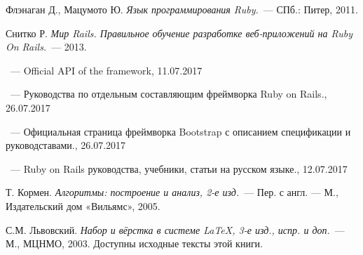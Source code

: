 \begin{thebibliography}{}

Флэнаган Д., Мацумото Ю.
{\em Язык программирования Ruby.}~---
СПб.: Питер, 2011.

Снитко Р.
{\em Мир Rails. Правильное обучение разработке веб-приложений на Ruby On Rails.}~---
2013.

~---
Official API of the framework, 11.07.2017

~---
Руководства по отдельным составляющим фреймворка Ruby on Rails., 26.07.2017


~---
Официальная страница фреймворка Bootstrap с описанием
спецификации и руководставами., 26.07.2017


~---
Ruby on Rails руководства, учебники, статьи на русском языке., 12.07.2017

Т. Кормен.
{\em Алгоритмы: построение и анализ, 2-е изд.}~---
Пер. с англ. --- М., Издательский дом «Вильямс», 2005.

С.М. Львовский.
{\em Набор и вёрстка в системе \LaTeX, 3-е изд., испр. и доп.}~---
М., МЦНМО, 2003. Доступны исходные тексты этой книги.

\end{thebibliography}
